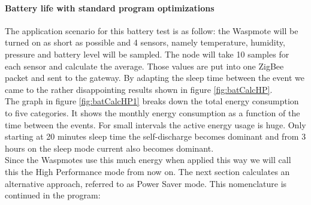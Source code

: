 \paragraph{Battery life with standard program optimizations}\label{batLife1}
The application scenario for this battery test is as follow: the Waspmote will be turned on as short as possible and 4 sensors, namely temperature, humidity, pressure and battery level will be sampled. The node will take 10 samples for each sensor and calculate the average. Those values are put into one ZigBee packet and sent to the gateway. By adapting the sleep time between the event we came to the rather disappointing results shown in figure \ref{fig:batCalcHP}.\\ The graph in figure \ref{fig:batCalcHP1} breaks down the total energy consumption to five categories. It shows the monthly energy consumption as a function of the time between the events. For small intervals the active energy usage is huge. Only starting at 20 minutes sleep time the self-discharge becomes dominant and from 3 hours on the sleep mode current also becomes dominant.\\
Since the Waspmotes use this much energy when applied this way we will call this the High Performance mode from now on. The next section calculates an alternative approach, referred to as Power Saver mode. This nomenclature is continued in the program:
